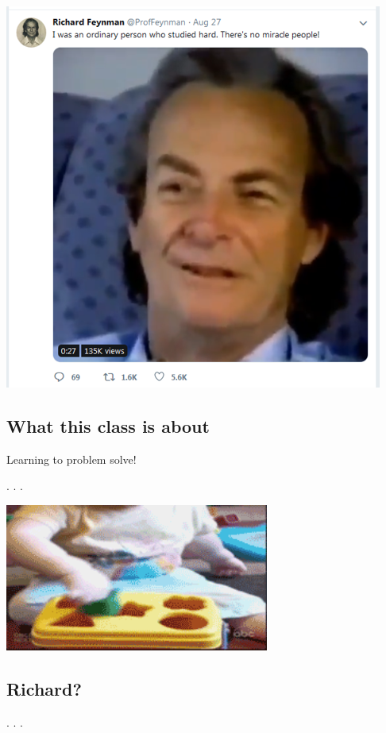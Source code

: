 \documentclass[
  letterpaper,
  DIV=11,
  numbers=noendperiod,
  oneside]{scrartcl}
\begin{document}
\includegraphics{./images/feynman_trying.png}

\hypertarget{what-this-class-is-about-3}{%
\subsection{What this class is about}\label{what-this-class-is-about-3}}

Learning to problem solve!

. . .

\includegraphics[width=0.65\textwidth,height=\textheight]{./images/problemsolved.gif}

\hypertarget{richard}{%
\subsection{Richard?}\label{richard}}

. . .
\end{document}
